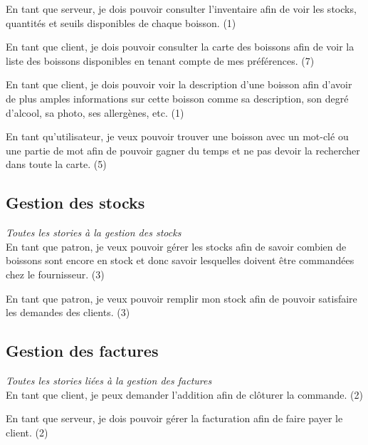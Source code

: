 \documentclass[10pt, a4, oneside, headings=normal]{scrartcl}
\begin{document}
En tant que serveur, je dois pouvoir consulter l'inventaire afin de voir les stocks, quantités et seuils disponibles de chaque boisson. (1)

En tant que client, je dois pouvoir consulter la carte des boissons afin de voir la liste des boissons disponibles en tenant compte de mes préférences. (7)

En tant que client, je dois pouvoir voir la description d'une boisson afin d'avoir de plus amples informations sur cette boisson comme sa description, son degré d'alcool, sa photo, ses allergènes, etc. (1)

En tant qu'utilisateur, je veux pouvoir trouver une boisson avec un mot-clé ou une partie de mot afin de pouvoir gagner du temps et ne pas devoir la rechercher dans toute la carte. (5)

\subsection{Gestion des stocks}
\emph{Toutes les stories à la gestion des stocks}
\\

En tant que patron, je veux pouvoir gérer les stocks afin de savoir combien de boissons sont encore en stock et donc savoir lesquelles doivent être commandées chez le fournisseur. (3)

En tant que patron, je veux pouvoir remplir mon stock afin de pouvoir satisfaire les demandes des clients. (3)

\subsection{Gestion des factures}
\emph{Toutes les stories liées à la gestion des factures}
\\

En tant que client, je peux demander l'addition afin de clôturer la commande. (2)

En tant que serveur, je dois pouvoir gérer la facturation afin de faire payer le client. (2)
\end{document}
